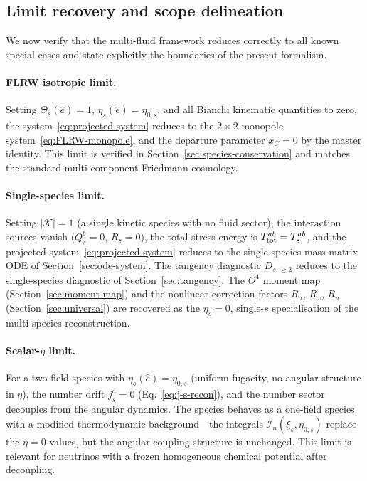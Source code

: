 \subsection{Limit recovery and scope delineation}
\label{sec:limit-recovery}

We now verify that the multi-fluid framework
reduces correctly to all known special cases and
state explicitly the boundaries of the present
formalism.


\paragraph{FLRW isotropic limit.}

Setting $\Theta_s(\hat{e}) = 1$,
$\eta_s(\hat{e}) = \eta_{0,s}$, and all Bianchi
kinematic quantities to zero, the
system~\eqref{eq:projected-system} reduces to the
$2 \times 2$ monopole
system~\eqref{eq:FLRW-monopole}, and the departure
parameter $x_C = 0$ by the master identity.  This
limit is verified in Section~\ref{sec:species-conservation}
and matches the standard multi-component Friedmann
cosmology.


\paragraph{Single-species limit.}

Setting $|\mathcal{K}| = 1$ (a single kinetic species
with no fluid sector), the interaction sources vanish
($Q_s^b = 0$, $R_s = 0$), the total stress-energy is
$T^{ab}_{\rm tot} = T_s^{ab}$, and the projected
system~\eqref{eq:projected-system} reduces to the
single-species mass-matrix ODE of
Section~\ref{sec:ode-system}.  The tangency diagnostic
$D_{s,\geq 2}$ reduces to the single-species
diagnostic of Section~\ref{sec:tangency}.  The
$\Theta^4$ moment map
(Section~\ref{sec:moment-map}) and the nonlinear
correction factors $R_\sigma$, $R_\omega$, $R_{\dot{u}}$
(Section~\ref{sec:universal}) are recovered as the
$\eta_s = 0$, single-$s$ specialisation of the
multi-species reconstruction.


\paragraph{Scalar-$\eta$ limit.}

For a two-field species with
$\eta_s(\hat{e}) = \eta_{0,s}$ (uniform fugacity,
no angular structure in $\eta$), the number drift
$j_s^a = 0$ (Eq.~\ref{eq:j-s-recon}), and the
number sector decouples from the angular dynamics.
The species behaves as a one-field species with a
modified thermodynamic background---the integrals
$\mathcal{I}_n(\xi_s, \eta_{0,s})$ replace the
$\eta = 0$ values, but the angular coupling
structure is unchanged.  This limit is relevant for
neutrinos with a frozen homogeneous chemical potential
after decoupling.


